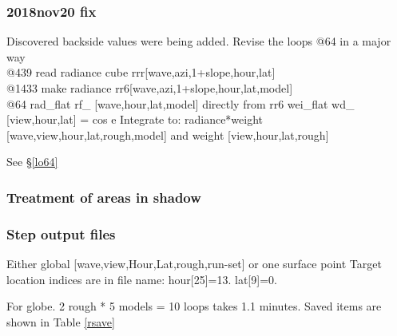 \documentclass{article}
\begin{document}
\subsubsection{2018nov20 fix}
Discovered backside values were being added. Revise the loops @64 in a major way
\\ @439 read radiance cube rrr[wave,azi,1+slope,hour,lat]
\\ @1433 make radiance     rr6[wave,azi,1+slope,hour,lat,model]
\\ @64 rad_flat rf_ [wave,hour,lat,model] directly from rr6
\qii     wei_flat wd_ [view,hour,lat] = cos e
\qi Integrate to: radiance*weight [wave,view,hour,lat,rough,model]
\qii  and weight [view,hour,lat,rough]

See \S \ref{lo64}

\subsubsection{Treatment of areas in shadow} %



\subsubsection{Step output files} %

Either global    [wave,view,Hour,Lat,rough,run-set]
\qi  or one surface point  
\qi Target location indices are in file name: hour[25]=13. lat[9]=0.

For globe. 2 rough * 5 models = 10 loops takes 1.1 minutes. 
Saved items are shown in Table \ref{rsave}
\end{document}

